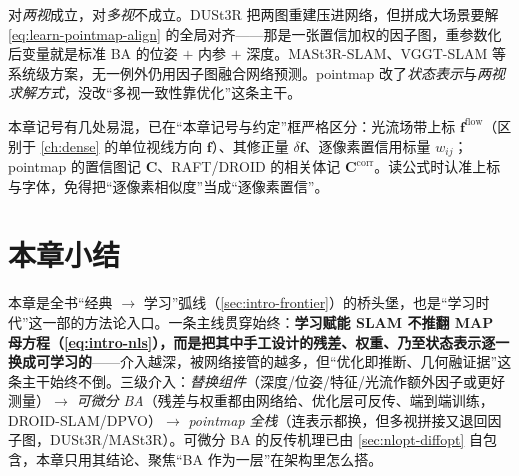 \begin{pitfall}
对\emph{两视}成立，对\emph{多视}不成立。DUSt3R 把两图重建压进网络，但拼成大场景要解 \cref{eq:learn-pointmap-align} 的全局对齐——那是一张置信加权的因子图，重参数化后变量就是标准 BA 的位姿 $+$ 内参 $+$ 深度。MASt3R-SLAM、VGGT-SLAM 等系统级方案，无一例外仍用因子图融合网络预测。pointmap 改了\emph{状态表示}与\emph{两视求解方式}，没改“多视一致性靠优化”这条主干。
\end{pitfall}

\begin{pitfall}
本章记号有几处易混，已在“本章记号与约定”框严格区分：光流场带上标 $\mathbf{f}^{\mathrm{flow}}$（区别于 \cref{ch:dense} 的单位视线方向 $\mathbf{f}$）、其修正量 $\delta\mathbf{f}$、逐像素置信用标量 $w_{ij}$；pointmap 的置信图记 $\mathbf{C}$、RAFT/DROID 的相关体记 $\mathbf{C}^{\mathrm{corr}}$。读公式时认准上标与字体，免得把“逐像素相似度”当成“逐像素置信”。
\end{pitfall}

\section*{本章小结}

本章是全书“经典 $\to$ 学习”弧线（\cref{sec:intro-frontier}）的桥头堡，也是“学习时代”这一部的方法论入口。一条主线贯穿始终：\textbf{学习赋能 SLAM 不推翻 MAP 母方程（\cref{eq:intro-nls}），而是把其中手工设计的残差、权重、乃至状态表示逐一换成可学习的}——介入越深，被网络接管的越多，但“优化即推断、几何融证据”这条主干始终不倒。三级介入：\emph{替换组件}（深度/位姿/特征/光流作额外因子或更好测量）$\to$ \emph{可微分 BA}（残差与权重都由网络给、优化层可反传、端到端训练，DROID-SLAM/DPVO）$\to$ \emph{pointmap 全栈}（连表示都换，但多视拼接又退回因子图，DUSt3R/MASt3R）。可微分 BA 的反传机理已由 \cref{sec:nlopt-diffopt} 自包含，本章只用其结论、聚焦“BA 作为一层”在架构里怎么搭。

